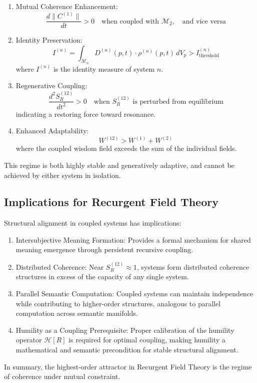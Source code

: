 \begin{enumerate}
    \item Mutual Coherence Enhancement:
    \begin{equation}
    \frac{d\|C^{(1)}\|}{dt} > 0 \quad \text{when coupled with } \mathcal{M}_2, \quad \text{and vice versa}
    \end{equation}
    \item Identity Preservation:
    \begin{equation}
    I^{(n)} = \int_{\mathcal{M}_n} D^{(n)}(p,t) \cdot \rho^{(n)}(p,t) \, dV_p > I^{(n)}_{\text{threshold}}
    \end{equation}
    where \(I^{(n)}\) is the identity measure of system \(n\).
    \item Regenerative Coupling:
    \begin{equation}
    \frac{d^2 S_R^{(12)}}{dt^2} > 0 \quad \text{when } S_R^{(12)} \text{ is perturbed from equilibrium}
    \end{equation}
    indicating a restoring force toward resonance.
    \item Enhanced Adaptability:
    \begin{equation}
    W^{(12)} > W^{(1)} + W^{(2)}
    \end{equation}
    where the coupled wisdom field exceeds the sum of the individual fields.
\end{enumerate}

This regime is both highly stable and generatively adaptive, and cannot be achieved by either system in isolation.

\subsection{Implications for Recurgent Field Theory}

Structural alignment in coupled systems has implications:

\begin{enumerate}
    \item Intersubjective Meaning Formation: Provides a formal mechanism for shared meaning emergence through persistent recursive coupling.
    \item Distributed Coherence: Near \(S_R^{(12)} \approx 1\), systems form distributed coherence structures in excess of the capacity of any single system.
    \item Parallel Semantic Computation: Coupled systems can maintain independence while contributing to higher-order structures, analogous to parallel computation across semantic manifolds.
    \item Humility as a Coupling Prerequisite: Proper calibration of the humility operator \(\mathcal{H}[R]\) is required for optimal coupling, making humility a mathematical and semantic precondition for stable structural alignment.
\end{enumerate}

In summary, the highest-order attractor in Recurgent Field Theory is the regime of coherence under mutual constraint.